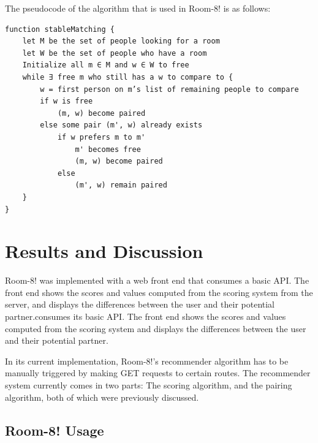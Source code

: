\documentclass[journal]{IEEEtran}
\begin{document}
The pseudocode of the algorithm that is used in Room-8! is as follows:
\newpage
\begin{verbatim}
function stableMatching {
    let M be the set of people looking for a room
    let W be the set of people who have a room
    Initialize all m ∈ M and w ∈ W to free
    while ∃ free m who still has a w to compare to {
        w = first person on m’s list of remaining people to compare
        if w is free
            (m, w) become paired
        else some pair (m', w) already exists
            if w prefers m to m'
                m' becomes free
                (m, w) become paired
            else
                (m', w) remain paired
    }
}
\end{verbatim}


\section{Results and Discussion}
Room-8! was implemented with a web front end that consumes a basic API. The front end shows the scores and values
computed from the scoring system from the server, and displays the differences between the user and their potential
partner.consumes its basic API. The front end shows the scores and values computed from the scoring system and displays
the differences between the user and their potential partner.

In its current implementation, Room-8!'s recommender algorithm has to be manually triggered by making GET requests to
certain routes. The recommender system currently comes in two parts: The scoring algorithm, and the pairing algorithm,
both of which were previously discussed.

    \subsection{Room-8! Usage}
\end{document}
